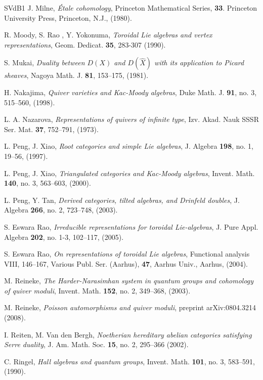 \documentclass[a4paper,10pt]{amsart}
\numberwithin{equation}{section}
\begin{document}
{{\begin{thebibliography}{SVdB1}
J. Milne, \emph{\'Etale cohomology}, Princeton Mathematical Series, \textbf{33}. Princeton University Press, Princeton, N.J., (1980).

R. Moody, S. Rao , Y. Yokonuma, \emph{Toroidal Lie algebras and vertex
representations}, Geom. Dedicat. \textbf{35}, 283-307 (1990).

S. Mukai, \emph{Duality between $D(X)$ and $D(\hat X)$ with its application to Picard sheaves},
Nagoya Math. J. \textbf{81}, 153--175, (1981).

H. Nakajima, \emph{Quiver varieties and Kac-Moody algebras}, Duke Math. J. \textbf{91}, no. 3, 515--560, (1998).

L. A. Nazarova, \emph{Representations of quivers of infinite type}, Izv. Akad. Nauk SSSR Ser. Mat. \textbf{37}, 752--791, (1973).

L. Peng, J. Xiao, \emph{Root categories and simple Lie algebras}, J. Algebra \textbf{198}, no. 1, 19--56, (1997).

L. Peng, J. Xiao, \emph{Triangulated categories and Kac-Moody algebras}, Invent. Math. \textbf{140}, no. 3, 563--603, (2000).

L. Peng, Y. Tan, \emph{Derived categories, tilted algebras, and Drinfeld doubles},  J. Algebra  \textbf{266},  no. 2, 723--748, (2003).

S. Eswara Rao, \emph{Irreducible representations for toroidal Lie-algebras}, J. Pure Appl. Algebra \textbf{202}, no. 1-3, 102--117, (2005).

S. Eswara Rao, \emph{On representations of toroidal Lie algebras}, Functional analysis VIII, 146--167, Various Publ. Ser. (Aarhus), \textbf{47}, Aarhus Univ., Aarhus, (2004).

M. Reineke, \emph{The Harder-Narasimhan system in quantum groups and
cohomology of quiver moduli},  Invent. Math. \textbf{152}, no. 2, 349--368, (2003).

M. Reineke, \emph{Poisson automorphisms and quiver moduli}, preprint arXiv:0804.3214 (2008).

I. Reiten, M. Van den Bergh, \emph{Noetherian hereditary abelian categories satisfying Serre duality}, J. Am. Math. Soc. \textbf{15}, no. 2, 295--366 (2002).

C. Ringel, \emph{Hall algebras and quantum groups},  Invent. Math.
\textbf{101},  no. 3, 583--591, (1990).


\end{thebibliography}}}
\end{document}
